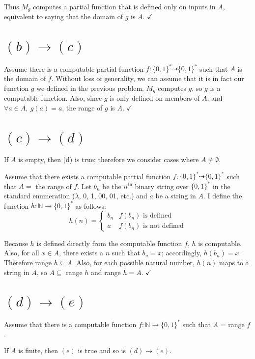 \documentclass[11pt]{article}
\let\imp\rightarrow
\begin{document}
Thus $M_g$ computes a partial function that is defined only on inputs in $A$, equivalent to saying that the domain of $g$ is $A$. $\checkmark$


\section*{$(b) \imp (c)$}

Assume there is a computable partial function $f: \{0,1\}^* \dashrightarrow \{0,1\}^*$ such that $A$ is the domain of $f$.
Without loss of generality, we can assume that it is in fact our function $g$ we defined in the previous problem.
$M_g$ computes $g$, so $g$ is a computable function.
Also, since $g$ is only defined on members of $A$, and $ \forall a \in A,\ g(a) = a$, the range of $g$ is $A$. $\checkmark$


\section*{$(c) \imp (d)$}

If $A$ is empty, then (d) is true; therefore we consider cases where $A \neq \emptyset$.

Assume that there exists a computable partial function $f : \{0,1\}^* \dashrightarrow \{0,1\}^*$ such that $A = $ the range of $f$.
Let $b_n$ be the $n^{\text{th}}$ binary string over $\{0,1\}^*$ in the standard enumeration ($\lambda$, 0, 1, 00, 01, etc.) and $a$ be a string in $A$.
I define the function $h : \mathbb{N} \imp \{0,1\}^*$ as follows:
\[ h(n) =
	\begin{cases}
		b_n & f(b_n) \text{ is defined} \\
		a & f(b_n) \text{ is not defined}
	\end{cases}
\]

Because $h$ is defined directly from the computable function $f$, $h$ is computable.
Also, for all $x\in A$, there exists a $n$ such that $b_n = x$; accordingly, $h(b_n) = x$. 
Therefore range $h \subseteq A$.
Also, for each possible natural number, $h(n)$ maps to a string in $A$, so $A \subseteq $ range $h$ and range $h = A$. $\checkmark$


\section*{$(d) \imp (e)$}
Assume that there is a computable function $f : \mathbb{N} \imp \{0,1\}^*$ such that $A$ = range $f$.

If $A$ is finite, then $(e)$ is true and so is $(d) \imp (e)$.
\end{document}
